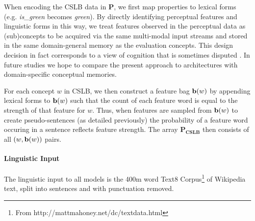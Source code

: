 \documentclass[11pt]{article}
\begin{document}
When encoding the CSLB data in \(\mathbf{P}\), we first map properties to lexical forms (e.g. \emph{is\_green} becomes \emph{green}). By directly identifying perceptual features and linguistic forms in this way, we treat features observed in the perceptual data as (sub)concepts to be acquired via the same multi-modal input streams and stored in the same domain-general memory as the evaluation concepts. This design decision in fact corresponds to a view of cognition that is sometimes disputed \cite{fodor1983modularity}. In future studies we hope to compare the present approach to architectures with domain-specific conceptual memories. 

For each concept \(w\) in CSLB, we then construct a feature bag \({\bf b}(w)\) by appending lexical forms to \({\bf b}(w)\) such that the count of each feature word is equal to the strength of that feature for \(w\). Thus, when features are sampled from \({\bf b}(w)\) to create pseudo-sentences (as detailed previously) the probability of a feature word occuring in a sentence reflects feature strength. The array \(\mathbf{P_{CSLB}}\) then consists of all \( (w,  {\bf b}(w) ) \) pairs.

\paragraph{Linguistic Input} The linguistic input to all models is the 400m word Text8 Corpus\footnote{From http://mattmahoney.net/dc/textdata.html} of Wikipedia text, split into sentences and with punctuation removed. 
\end{document}
